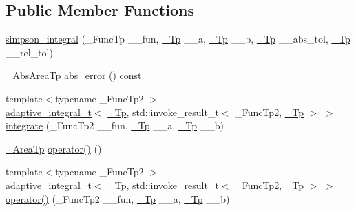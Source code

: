 \subsection*{Public Member Functions}
\begin{DoxyCompactItemize}
\item 
\hyperlink{class____gnu__cxx_1_1simpson__integral_aa94bd76eec39db81dd8da7c56ed2f4fe}{simpson\+\_\+integral} (\+\_\+\+Func\+Tp \+\_\+\+\_\+fun, \hyperlink{namespace____gnu__cxx_a3b19a9c800ca194374ef9172290f7d79}{\+\_\+\+Tp} \+\_\+\+\_\+a, \hyperlink{namespace____gnu__cxx_a3b19a9c800ca194374ef9172290f7d79}{\+\_\+\+Tp} \+\_\+\+\_\+b, \hyperlink{namespace____gnu__cxx_a3b19a9c800ca194374ef9172290f7d79}{\+\_\+\+Tp} \+\_\+\+\_\+abs\+\_\+tol, \hyperlink{namespace____gnu__cxx_a3b19a9c800ca194374ef9172290f7d79}{\+\_\+\+Tp} \+\_\+\+\_\+rel\+\_\+tol)
\item 
\hyperlink{class____gnu__cxx_1_1simpson__integral_a5c34021e2fac307bd282bf177db9e848}{\+\_\+\+Abs\+Area\+Tp} \hyperlink{class____gnu__cxx_1_1simpson__integral_a879f106bb8f0ef546008c56dfae8696b}{abs\+\_\+error} () const
\item 
{\footnotesize template$<$typename \+\_\+\+Func\+Tp2 $>$ }\\\hyperlink{struct____gnu__cxx_1_1adaptive__integral__t}{adaptive\+\_\+integral\+\_\+t}$<$ \hyperlink{namespace____gnu__cxx_a3b19a9c800ca194374ef9172290f7d79}{\+\_\+\+Tp}, std\+::invoke\+\_\+result\+\_\+t$<$ \+\_\+\+Func\+Tp2, \hyperlink{namespace____gnu__cxx_a3b19a9c800ca194374ef9172290f7d79}{\+\_\+\+Tp} $>$ $>$ \hyperlink{class____gnu__cxx_1_1simpson__integral_a201a7dc0f406d2b1afe50d4b13a386ff}{integrate} (\+\_\+\+Func\+Tp2 \+\_\+\+\_\+fun, \hyperlink{namespace____gnu__cxx_a3b19a9c800ca194374ef9172290f7d79}{\+\_\+\+Tp} \+\_\+\+\_\+a, \hyperlink{namespace____gnu__cxx_a3b19a9c800ca194374ef9172290f7d79}{\+\_\+\+Tp} \+\_\+\+\_\+b)
\item 
\hyperlink{class____gnu__cxx_1_1simpson__integral_a4d84c87903e8359f4a617e08703c15a1}{\+\_\+\+Area\+Tp} \hyperlink{class____gnu__cxx_1_1simpson__integral_a98cd0a2bd09ed77c2c0313ffd4b43689}{operator()} ()
\item 
{\footnotesize template$<$typename \+\_\+\+Func\+Tp2 $>$ }\\\hyperlink{struct____gnu__cxx_1_1adaptive__integral__t}{adaptive\+\_\+integral\+\_\+t}$<$ \hyperlink{namespace____gnu__cxx_a3b19a9c800ca194374ef9172290f7d79}{\+\_\+\+Tp}, std\+::invoke\+\_\+result\+\_\+t$<$ \+\_\+\+Func\+Tp2, \hyperlink{namespace____gnu__cxx_a3b19a9c800ca194374ef9172290f7d79}{\+\_\+\+Tp} $>$ $>$ \hyperlink{class____gnu__cxx_1_1simpson__integral_a09e6a430b486fde23bcba7130935c105}{operator()} (\+\_\+\+Func\+Tp2 \+\_\+\+\_\+fun, \hyperlink{namespace____gnu__cxx_a3b19a9c800ca194374ef9172290f7d79}{\+\_\+\+Tp} \+\_\+\+\_\+a, \hyperlink{namespace____gnu__cxx_a3b19a9c800ca194374ef9172290f7d79}{\+\_\+\+Tp} \+\_\+\+\_\+b)
\end{DoxyCompactItemize}


